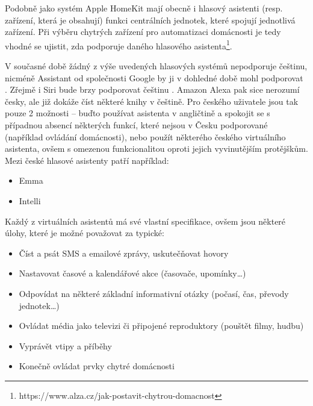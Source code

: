 Podobně jako systém Apple HomeKit mají obecně i hlasový asistenti (resp. zařízení, která je obsahují) funkci centrálních jednotek, které spojují jednotlivá zařízení. Při výběru chytrých zařízení pro automatizaci domácnosti je tedy vhodné se ujistit, zda podporuje daného hlasového asistenta\footnote{https://www.alza.cz/jak-postavit-chytrou-domacnost}.

V současné době žádný z výše uvedených hlasových systémů nepodporuje češtinu, nicméně Assistant od společnosti Google by ji v dohledné době mohl podporovat \cite{GoogleAssistantCestina}. Zřejmě i Siri bude brzy podporovat češtinu \cite{SiryCZ}. Amazon Alexa pak sice nerozumí česky, ale již dokáže číst některé knihy v češtině. Pro českého uživatele jsou tak pouze 2 možnosti – buďto používat asistenta v angličtině a spokojit se s případnou absencí některých funkcí, které nejsou v Česku podporované (například ovládání domácnosti), nebo použít některého českého virtuálního asistenta, ovšem s omezenou funkcionalitou oproti jejich vyvinutějším protějškům. Mezi české hlasové asistenty patří například:
\begin{itemize}
\item Emma
\item Intelli
\end{itemize}

Každý z virtuálních asistentů má své vlastní specifikace, ovšem jsou některé úlohy, které je možné považovat za typické:
\begin{itemize}
\item Číst a psát SMS a emailové zprávy, uskutečňovat hovory
\item Nastavovat časové a kalendářové akce (časovače, upomínky…)
\item Odpovídat na některé základní informativní otázky (počasí, čas, převody jednotek…)
\item Ovládat média jako televizi či připojené reproduktory (pouštět filmy, hudbu)
\item Vyprávět vtipy a příběhy
\item Konečně ovládat prvky chytré domácnosti \cite{VoiceAssistantsIntro}
\end{itemize}

